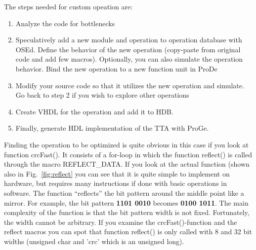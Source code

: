 \documentclass[twoside]{tceusermanual}
\begin{document}
 The steps needed for custom opeation are:
\begin{enumerate}
\item Analyze the code for bottlenecks

\item Speculatively add a new module and operation to operation
  database with OSEd. Define the behavior of the new operation
  (copy-paste from original code and add few macros). Optionally, you
  can also simulate the operation behavior. Bind the new operation to
  a new function unit in ProDe

\item Modify your source code so that it utilizes the new operation
  and simulate. Go back to step 2 if you wish to explore other
  operations

\item Create VHDL for the operation and add it to HDB.
 
\item Finally, generate HDL implementation of the TTA with ProGe.
\end{enumerate}


Finding the operation to be optimized is quite obvious in this case if
you look at function crcFast(). It consists of a for-loop in which the
function reflect() is called through the macro REFLECT\_DATA. If you
look at the actual function (shown also in Fig.~\ref{fig:reflect} you
can see that it is quite simple to implement on hardware, but requires
many instructions if done with basic operations in software. The
function ``reflects'' the bit pattern around the middle point like a
mirror. For example, the bit pattern \textbf{1101 0010} becomes
\textbf{0100 1011}. The main complexity of the function is that the bit 
pattern width is not fixed. Fortunately, the width cannot be
arbitrary. If you examine the crcFast()-function and the reflect
macros you can spot that function reflect() is only called with 8 and
32 bit widths (unsigned char and 'crc' which is an unsigned long).
\end{document}
